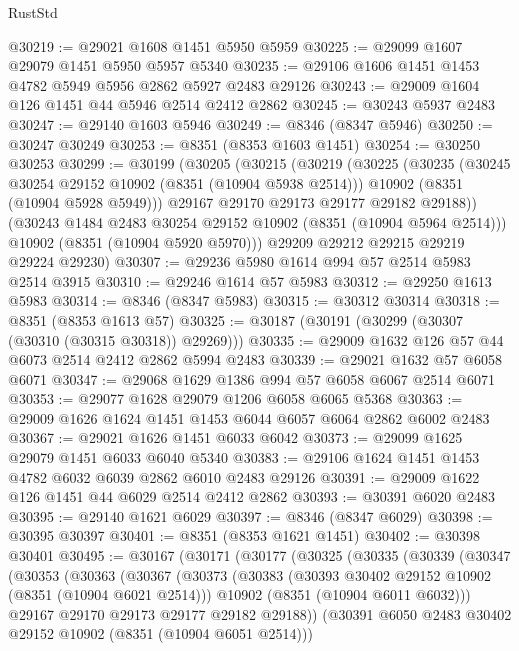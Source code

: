 \begin{lexlean}{RustStd}
\begin{coremodule}
@30219 := @29021 @1608 @1451 @5950 @5959
@30225 := @29099 @1607 @29079 @1451 @5950 @5957 @5340
@30235 := @29106 @1606 @1451 @1453 @4782 @5949 @5956 @2862 @5927 @2483 @29126
@30243 := @29009 @1604 @126 @1451 @44 @5946 @2514 @2412 @2862
@30245 := @30243 @5937 @2483
@30247 := @29140 @1603 @5946
@30249 := @8346 (@8347 @5946)
@30250 := @30247 @30249
@30253 := @8351 (@8353 @1603 @1451)
@30254 := @30250 @30253
@30299 := @30199
    (@30205
      (@30215
        (@30219
          (@30225
            (@30235
              (@30245 @30254 @29152 @10902 (@8351 (@10904 @5938 @2514)))
              @10902
              (@8351 (@10904 @5928 @5949)))
            @29167
            @29170
            @29173
            @29177
            @29182
            @29188))
        (@30243 @1484 @2483 @30254 @29152 @10902 (@8351 (@10904 @5964 @2514)))
        @10902
        (@8351 (@10904 @5920 @5970)))
      @29209
      @29212
      @29215
      @29219
      @29224
      @29230)
@30307 := @29236 @5980 @1614 @994 @57 @2514 @5983 @2514 @3915
@30310 := @29246 @1614 @57 @5983
@30312 := @29250 @1613 @5983
@30314 := @8346 (@8347 @5983)
@30315 := @30312 @30314
@30318 := @8351 (@8353 @1613 @57)
@30325 := @30187 (@30191 (@30299 (@30307 (@30310 (@30315 @30318)) @29269)))
@30335 := @29009 @1632 @126 @57 @44 @6073 @2514 @2412 @2862 @5994 @2483
@30339 := @29021 @1632 @57 @6058 @6071
@30347 := @29068 @1629 @1386 @994 @57 @6058 @6067 @2514 @6071
@30353 := @29077 @1628 @29079 @1206 @6058 @6065 @5368
@30363 := @29009 @1626 @1624 @1451 @1453 @6044 @6057 @6064 @2862 @6002 @2483
@30367 := @29021 @1626 @1451 @6033 @6042
@30373 := @29099 @1625 @29079 @1451 @6033 @6040 @5340
@30383 := @29106 @1624 @1451 @1453 @4782 @6032 @6039 @2862 @6010 @2483 @29126
@30391 := @29009 @1622 @126 @1451 @44 @6029 @2514 @2412 @2862
@30393 := @30391 @6020 @2483
@30395 := @29140 @1621 @6029
@30397 := @8346 (@8347 @6029)
@30398 := @30395 @30397
@30401 := @8351 (@8353 @1621 @1451)
@30402 := @30398 @30401
@30495 := @30167
    (@30171
      (@30177
        (@30325
          (@30335
            (@30339
              (@30347
                (@30353
                  (@30363
                    (@30367
                      (@30373
                        (@30383
                          (@30393 @30402 @29152 @10902 (@8351 (@10904 @6021 @2514)))
                          @10902
                          (@8351 (@10904 @6011 @6032)))
                        @29167
                        @29170
                        @29173
                        @29177
                        @29182
                        @29188))
                    (@30391 @6050 @2483 @30402 @29152 @10902 (@8351 (@10904 @6051 @2514)))

\end{coremodule}
\end{lexlean}
